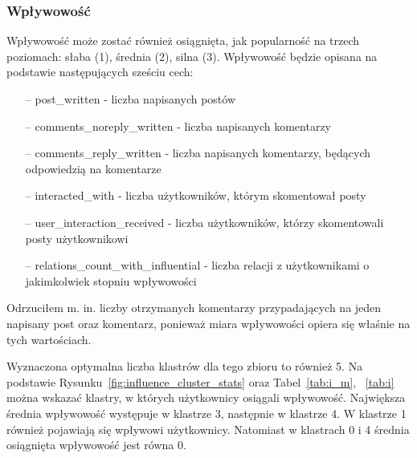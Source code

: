 \documentclass[polish,12pt]{aghthesis}
\begin{document}
\subsubsection{Wpływowość}

Wpływowość może zostać również osiągnięta, jak popularność na trzech poziomach: słaba (1), średnia (2), silna (3). Wpływowość będzie opisana na podstawie następujących sześciu cech:

\begin{itemize}
    \setlength\itemsep{0,1em}
    \item[--] post\_written - liczba napisanych postów
    \item[--] comments\_noreply\_written - liczba napisanych komentarzy 
    \item[--] comments\_reply\_written - liczba napisanych komentarzy, będących odpowiedzią na komentarze 
    \item[--] interacted\_with - liczba użytkowników, którym skomentował posty 
    \item[--] user\_interaction\_received - liczba użytkowników, którzy skomentowali posty użytkownikowi 
    \item[--] relations\_count\_with\_influential - liczba relacji z użytkownikami o jakimkolwiek stopniu wpływowości
\end{itemize}

Odrzuciłem m. in. liczby otrzymanych komentarzy przypadających na jeden napisany post oraz komentarz, ponieważ miara wpływowości opiera się właśnie na tych wartościach.

Wyznaczona optymalna liczba klastrów dla tego zbioru to również 5. Na podstawie Rysunku~\ref{fig:influence_cluster_stats} oraz Tabel~\ref{tab:i_m}, ~\ref{tab:i} można wskazać klastry, w których użytkownicy osiągali wpływowość. Największa średnia wpływowość występuje w klastrze 3, następnie w klastrze 4. W klastrze 1 również pojawiają się wpływowi użytkownicy. Natomiast w klastrach 0 i 4 średnia osiągnięta wpływowość jest równa 0.
\end{document}
